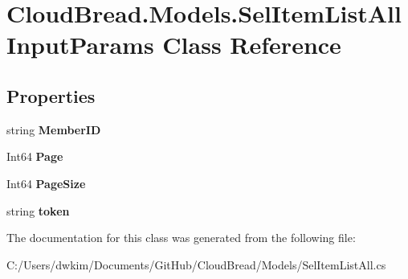 \hypertarget{a00092}{}\section{Cloud\+Bread.\+Models.\+Sel\+Item\+List\+All\+Input\+Params Class Reference}
\label{a00092}
\subsection*{Properties}
\begin{DoxyCompactItemize}
\item 
string {\bfseries Member\+ID}\hypertarget{a00092_a5a475a536972b1d79537f74d6d8baeea}{}\label{a00092_a5a475a536972b1d79537f74d6d8baeea}

\item 
Int64 {\bfseries Page}\hypertarget{a00092_a8fef231b4a2f2370e95ca0a7dc7d41fb}{}\label{a00092_a8fef231b4a2f2370e95ca0a7dc7d41fb}

\item 
Int64 {\bfseries Page\+Size}\hypertarget{a00092_a9280075d26081d3e718f9fc7e54af00d}{}\label{a00092_a9280075d26081d3e718f9fc7e54af00d}

\item 
string {\bfseries token}\hypertarget{a00092_abc5f713c35457f3a9fa6edabeae87b2b}{}\label{a00092_abc5f713c35457f3a9fa6edabeae87b2b}

\end{DoxyCompactItemize}


The documentation for this class was generated from the following file\+:\begin{DoxyCompactItemize}
\item 
C\+:/\+Users/dwkim/\+Documents/\+Git\+Hub/\+Cloud\+Bread/\+Models/Sel\+Item\+List\+All.\+cs\end{DoxyCompactItemize}
